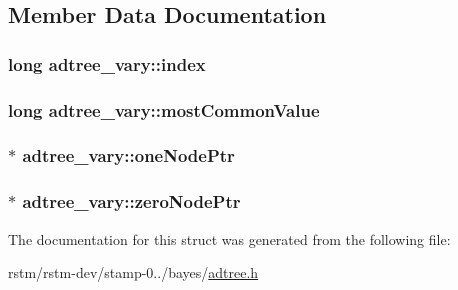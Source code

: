\subsection{Member Data Documentation}
\hypertarget{structadtree__vary_a0753c7505ea36c82554c228716a3693b}{
\subsubsection[{index}]{\setlength{\rightskip}{0pt plus 5cm}long adtree\-\_\-vary\-::index}}\label{structadtree__vary_a0753c7505ea36c82554c228716a3693b}
\hypertarget{structadtree__vary_ab2ce04a8ef80b347e2a6cc50bd36f434}{
\subsubsection[{most\-Common\-Value}]{\setlength{\rightskip}{0pt plus 5cm}long adtree\-\_\-vary\-::most\-Common\-Value}}\label{structadtree__vary_ab2ce04a8ef80b347e2a6cc50bd36f434}
\hypertarget{structadtree__vary_a5716bdbe6777ae45bd8e9600a9f6b3d0}{
\subsubsection[{one\-Node\-Ptr}]{$\ast$ adtree\-\_\-vary\-::one\-Node\-Ptr}}\label{structadtree__vary_a5716bdbe6777ae45bd8e9600a9f6b3d0}
\hypertarget{structadtree__vary_a7815e9cec9ae369bc8812675d055d101}{
\subsubsection[{zero\-Node\-Ptr}]{$\ast$ adtree\-\_\-vary\-::zero\-Node\-Ptr}}\label{structadtree__vary_a7815e9cec9ae369bc8812675d055d101}


The documentation for this struct was generated from the following file\-:\begin{DoxyCompactItemize}
\item 
rstm/rstm-\/dev/stamp-\/0../bayes/\hyperlink{adtree_8h}{adtree.\-h}\end{DoxyCompactItemize}
